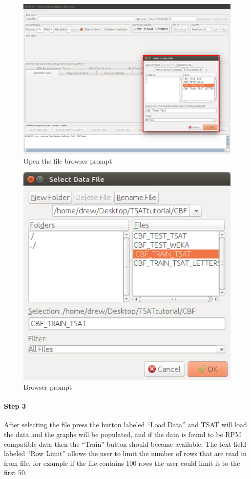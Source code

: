 \documentclass[titlepage, letterpaper, 12pt]{article}
\begin{document}
\begin{figure}[H]
	\includegraphics[width=\textwidth]{TSAT-training-step-2}
	\caption{Open the file browser prompt}
	\label{fig:TSAT-training-step-2}
\end{figure}
\begin{figure}[H]
	\center
	\includegraphics[width=.4\textwidth]{TSAT-training-step-3}
	\caption{Browser prompt}
	\label{fig:TSAT-training-step-3}
\end{figure}

\newpage
\paragraph{Step 3}
After selecting the file press the button labeled ``Load Data'' and  TSAT will load the data and the graphs will be populated, and if the data is found to be RPM compatible data then the ``Train'' button should become available. The text field labeled ``Row Limit'' allows the user to limit the number of rows that are read in from file, for example if the file contains 100 rows the user could limit it to the first 50.
\end{document}
